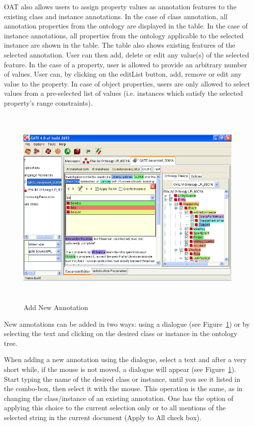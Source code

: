 {OAT also allows users to assign property values as annotation features
to the existing class and instance annotations. In the case of class
annotation, all annotation properties from the ontology are displayed
in the table. In the case of instance annotations, all properties from
the ontology applicable to the selected instance are shown in the
table. The table also shows existing features of the selected
annotation. User can then add, delete or edit any value(s) of the
selected feature.  In the case of a property, user is allowed to
provide an arbitrary number of values. User can, by clicking on the
editList button, add, remove or edit any value to the property.  In
case of object properties, users are only allowed to select values
from a pre-selected list of values (i.e.  instances which satisfy the
selected property's range constraints).
 

\begin{figure}[tbp]
\includegraphics[height=10cm]{ontology_ocat_add-new.png}
\caption{Add New Annotation} \label{fig:ocat:add_new}
\end{figure}

New annotations can be added in two ways: using a dialogue (see
Figure~\ref{fig:ocat:add_new}) or by selecting the text and clicking on the
desired class or instance in the ontology tree.

When adding a new annotation using the dialogue, select a text and
after a very short while, if the mouse is not moved, a dialogue will
appear (see Figure~\ref{fig:ocat:add_new}). Start typing the name of
the desired class or instance, until you see it listed in the
combo-box, then select it with the mouse. This operation is the same,
as in changing the class/instance of an existing annotation. One has
the option of applying this choice to the current selection only or to
all mentions of the selected string in the current document (Apply to
All check box).

}
